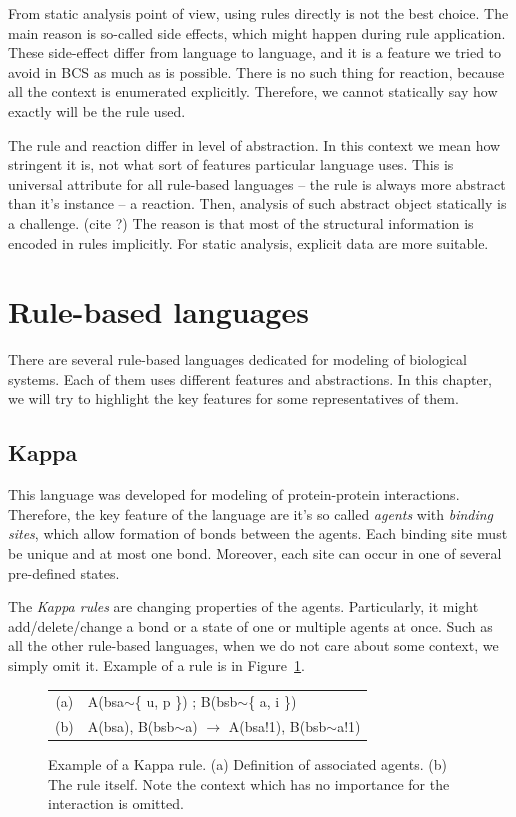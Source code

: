 \documentclass[12pt]{fithesis2}
\begin{document}
From static analysis point of view, using rules directly is not the best choice. The main reason is so-called side effects, which might happen during rule application. These side-effect differ from language to language, and it is a feature we tried to avoid in BCS as much as is possible. There is no such thing for reaction, because all the context is enumerated explicitly. Therefore, we cannot statically say how exactly will be the rule used.

The rule and reaction differ in level of abstraction. In this context we mean how stringent it is, not what sort of features particular language uses. This is universal attribute for all rule-based languages -- the rule is always more abstract than it's instance -- a reaction. Then, analysis of such abstract object statically is a challenge. (cite ?) The reason is that most of the structural information is encoded in rules implicitly. For static analysis, explicit data are more suitable.

\section{Rule-based languages}
\label{rule_based_languages}

There are several rule-based languages dedicated for modeling of biological systems. Each of them uses different features and abstractions. In this chapter, we will try to highlight the key features for some representatives of them.

\subsection{Kappa}
\label{kappa}

This language was developed for modeling of protein-protein interactions. Therefore, the key feature of the language are it's so called \textit{agents} with \textit{binding sites}, which allow formation of bonds between the agents. Each binding site must be unique and at most one bond. Moreover, each site can occur in one of several pre-defined states.

The \textit{Kappa rules} are changing properties of the agents. Particularly, it might add/delete/change a bond or a state of one or multiple agents at once. Such as all the other rule-based languages, when we do not care about some context, we simply omit it. Example of a rule is in Figure~\ref{kappa-rule}.

\begin{figure}[!h]
\begin{center}
\begin{tabular}{c l}
(a) & A(bsa$\sim$\{ u, p \}) ; B(bsb$\sim$\{ a, i \}) \\
(b) & A(bsa), B(bsb$\sim$a) $\rightarrow$ A(bsa!1), B(bsb$\sim$a!1) \\
\end{tabular}
\end{center}
\caption{Example of a Kappa rule. (a) Definition of associated agents. (b) The rule itself. Note the context which has no importance for the interaction is omitted.}\label{kappa-rule}
\end{figure}
\end{document}
